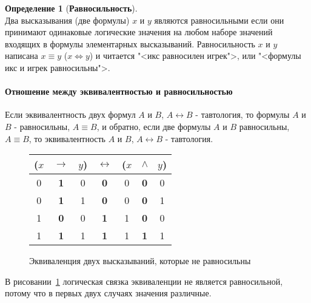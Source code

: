 \documentclass[fleqn,11pt]{article}
\theoremstyle{definition}
\newtheorem{definition}{Определение}
\begin{document}
\begin{definition}[\textbf{Равносильность}] ~\\
	Два высказывания (две формулы) $x$ и $y$ являются равносильными если они принимают одинаковые логические
	значения на любом наборе значений входящих в формулы элементарных высказываний. Равносильность $x$ и $y$
	написана $x \equiv y$ ($x \Leftrightarrow y$) и читается "<икс равносилен игрек">, или "<формулы икс и игрек равносильны">.
\end{definition}

\paragraph{Отношение между эквивалентностью и равносильностью}
Если эквивалентность двух формул $A$ и $B$, $A \leftrightarrow B$ - тавтология, то формулы $A$ и $B$ - равносильны,
$A \equiv B$, и обратно, если две формулы $A$ и $B$ равносильны, $A \equiv B$, то эквивалентность $A$ и $B$,
$A \leftrightarrow B$ - тавтология.
\FloatBarrier
\begin{figure}[h]
	\begin{center}
		\begin{tabular}{|ccc|c|ccc|} \hline
			($x$ & $\rightarrow$ & $y$) & $\leftrightarrow$ & ($x$ & $\land$ & $y$) \\ \hline
			0 & \textbf{1} & 0 & \textbf{0} & 0 & \textbf{0} & 0 \\
			0 & \textbf{1} & 1 & \textbf{0} & 0 & \textbf{0} & 1 \\
			1 & \textbf{0} & 0 & \textbf{1} & 1 & \textbf{0} & 0 \\
			1 & \textbf{1} & 1 & \textbf{1} & 1 & \textbf{1} & 1 \\
			\hline
		\end{tabular}
	\end{center}
	\caption{Эквиваленция двух высказываний, которые не равносильны}\label{fig:biconNotEquiv}
\end{figure}
В рисовании~\ref{fig:biconNotEquiv} логическая связка эквиваленции не является равносильной, потому что в первых
двух случаях значения различные.
\end{document}
